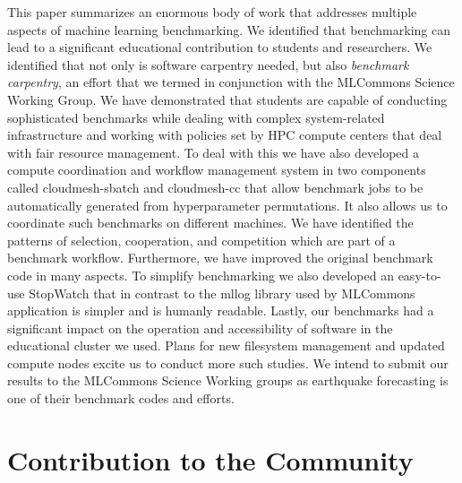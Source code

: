 \documentclass[utf8]{FrontiersinVancouver} %
\newcommand{\TODO}[2]{\todo[inline]{{\bf \color{red} #1} #2}}
\begin{document}
This paper summarizes an enormous body of work that addresses multiple
aspects of machine learning benchmarking. We identified that
benchmarking can lead to a significant educational contribution to
students and researchers. We identified that not only is software
carpentry needed, but also {\em benchmark carpentry}, an effort that we termed in conjunction
with the MLCommons Science Working Group. We have
demonstrated that students are capable of conducting sophisticated
benchmarks while dealing with complex system-related infrastructure
and working with policies set by HPC compute centers that deal with
fair resource management. To deal with this we have also developed a
compute coordination and workflow management system in two components
called cloudmesh-sbatch and cloudmesh-cc that allow benchmark jobs to
be automatically generated from hyperparameter permutations. It also
allows us to coordinate such benchmarks on different machines. We have
identified the patterns of selection, cooperation, and competition
which are part of a benchmark workflow. Furthermore, we have improved
the original benchmark code in many aspects. To simplify benchmarking
we also developed an easy-to-use StopWatch that in contrast to the
mllog library used by MLCommons application is simpler and is humanly
readable. Lastly, our benchmarks had a significant impact on the
operation and accessibility of software in the educational cluster we
used. Plans for new filesystem management and updated compute nodes
excite us to conduct more such studies. We intend to submit our
results to the MLCommons Science Working groups as earthquake
forecasting is one of their benchmark codes and efforts.

\section{Contribution to the Community}

\TODO{All}{TBD}

\end{document}
